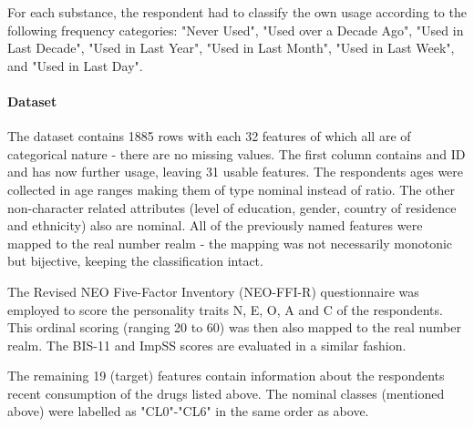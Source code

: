 \documentclass{article}
\begin{document}
For each substance, the respondent had to classify the own usage according to the following frequency categories: "Never Used", "Used over a Decade Ago", "Used in Last Decade", "Used in Last Year", "Used in Last Month", "Used in Last Week", and "Used in Last Day".



\paragraph{Dataset}

\noindent The dataset contains 1885 rows with each 32 features of which all are of categorical nature - there are no missing values. The first column contains and ID and has now further usage, leaving 31 usable features. The respondents ages were collected in age ranges making them of type nominal instead of ratio. The other non-character related attributes (level of education, gender, country of residence and ethnicity) also are nominal. All of the previously named features were mapped to the real number realm - the mapping was not necessarily monotonic but bijective, keeping the classification intact.

The Revised NEO Five-Factor Inventory (NEO-FFI-R) questionnaire was employed to score the personality traits N, E, O, A and C of the respondents. This ordinal scoring (ranging 20 to 60) was then also mapped to the real number realm. The BIS-11 and ImpSS scores are evaluated in a similar fashion.

The remaining 19 (target) features contain information about the respondents recent consumption of the drugs listed above. The nominal classes (mentioned above) were labelled as "CL0"-"CL6" in the same order as above.
\end{document}
